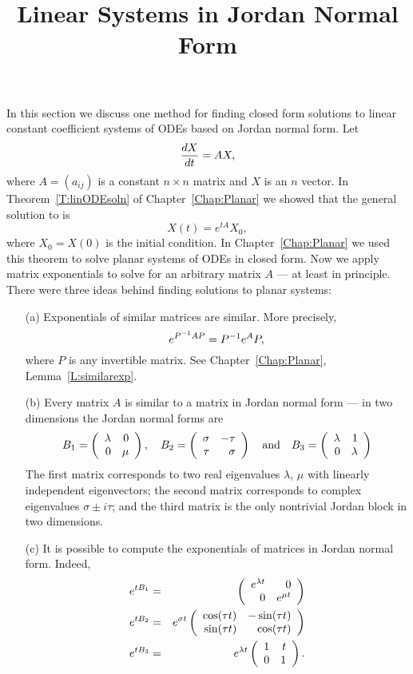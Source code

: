 \documentclass{ximera}
\title{Linear Systems in Jordan Normal Form}
\begin{document}
\begin{abstract}
\end{abstract}
\maketitle


\label{sec:LinHomSys}

In this section we discuss one method for finding 
closed form solutions to 
linear constant coefficient systems of ODEs based on 
Jordan normal form. Let  
\begin{equation}  \label{eq:linsys}
\displaystyle\frac{dX}{dt} = AX,
\end{equation}
where $A=(a_{ij})$ is a constant $n\times n$ matrix and $X$ is an 
$n$ vector.  In Theorem~\ref{T:linODEsoln} of Chapter~\ref{Chap:Planar} 
we showed that the general solution to 
 is
\[
X(t) = e^{tA}X_0,
\]
where $X_0=X(0)$ is the initial condition.  
In Chapter~\ref{Chap:Planar} 
we used this theorem to solve planar systems of ODEs in closed form.
Now we apply matrix exponentials to solve  for an 
arbitrary matrix $A$ --- at least in principle.
There were three ideas behind finding solutions to planar systems:
\begin{itemize}
\item[(a)] Exponentials of similar 
matrices are similar.  More precisely,
\[
e^{P^{-1} AP} = P^{-1} e^{A}P,
\]
where $P$ is any invertible matrix.  
See Chapter~\ref{Chap:Planar}, Lemma~\ref{L:similarexp}.
\item[(b)]	Every matrix $A$ is similar to a matrix in Jordan normal 
form --- in two dimensions the Jordan normal forms are
\[
B_1=\left(\begin{array}{rr} \lambda & 0\\ 0 &\mu\end{array}\right), \quad B_2=\left(\begin{array}{rr} \sigma & -\tau\\ \tau &\sigma\end{array}\right)
\quad\mbox{and}\quad B_3=\left(\begin{array}{rr} \lambda & 1\\ 0 &\lambda\end{array}\right)
\]
The first matrix corresponds to two 
real eigenvalues $\lambda$, $\mu$
with linearly independent eigenvectors; the second matrix 
corresponds to complex eigenvalues 
$\sigma\pm i\tau$; and the third matrix is the only nontrivial 
Jordan block in two dimensions.
\item[(c)]	It is possible to compute the exponentials of matrices in
Jordan normal form.  Indeed,
\begin{eqnarray*}
e^{tB_1} &  = & \left(\begin{array}{rr} e^{\lambda t} & 0\\ 0 &e^{\mu t}\end{array}\right) \\
e^{tB_2} & = & 
e^{\sigma t}\left(\begin{array}{rr} \cos(\tau t) & -\sin(\tau t)\\ \sin(\tau t) &\cos(\tau t)\end{array}\right) \\
e^{tB_3} & = &  e^{\lambda t}\left(\begin{array}{rr} 1 & t\\ 0 &1\end{array}\right).
\end{eqnarray*}
\end{itemize}
\end{document}

